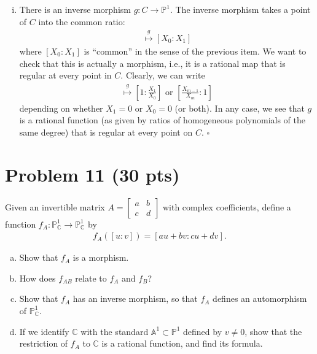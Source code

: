 \documentclass[12pt]{article}
\newcommand{\A}{\mathbb{A}}
\newcommand{\f}[2]{\frac{#1}{#2}}
\begin{document}
\begin{enumerate}[(i)]
	
	\item There is an inverse morphism $g: C\to \mathbb{P}^1$. The inverse morphism takes a point of $C$ into the common ratio:
	\begin{align*}
	[X_0 : \dots : X_m] \stackrel{g}{\mapsto} [X_0 : X_1]
	\end{align*}
	where $[X_0 : X_1]$ is ``common'' in the sense of the previous item. We want to check that this is actually a morphism, i.e., it is a rational map that is regular at every point in $C$. Clearly, we can write
	\begin{align*}
	[X_0 : \dots : X_m] \stackrel{g}{\mapsto} \left[1 : \f{X_1}{X_0}\right] \mbox{ or } \left[\f{X_{m-1}}{X_m} : 1\right]
	\end{align*}
	depending on whether $X_1 =0$ or $X_0 = 0$ (or both). In any case, we see that $g$ is a rational function (as given by ratios of homogeneous polynomials of the same degree) that is regular at every point on $C$. \hfill $\square$ 
	
	
	
	
\end{enumerate}


\newpage







\section*{Problem 11 \small{(30 pts)}}
Given an invertible matrix $A = \begin{bmatrix}
a&b\\c&d
\end{bmatrix}$ with complex coefficients, define a function $f_A : \mathbb{P}^1_{\mathbb{C}} \to \mathbb{P}^1_{\mathbb{C}}$ by
\begin{align*}
f_A ([u:v]) = [au + bv : cu + dv].
\end{align*}
\begin{enumerate}[(a)]
	\item Show that $f_A$ is a morphism. 

	\item How does $f_{AB}$ relate to $f_A$ and $f_B$? 
	
	\item Show that $f_A$ has an inverse morphism, so that $f_A$ defines an automorphism of $\mathbb{P}^1_{\mathbb{C}}$. 
	
	 
	\item If we identify $\mathbb{C}$ with the standard $\A^1 \subset \mathbb{P}^1$ defined by $v\neq 0$, show that the restriction of $f_A$ to $\mathbb{C}$ is a rational function, and find its formula.  
\end{enumerate}
\end{document}
